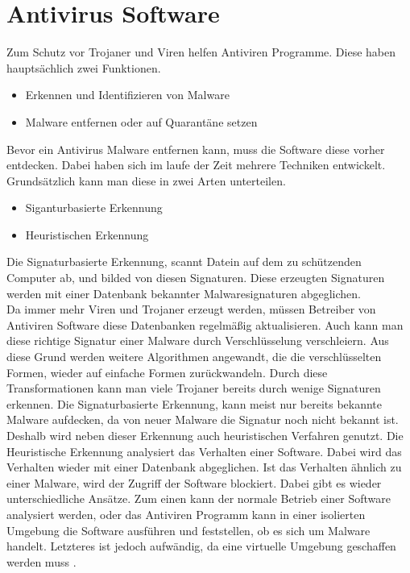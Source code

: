 \section{Antivirus Software}\label{sec:antivirus}
Zum Schutz vor Trojaner und Viren helfen Antiviren Programme. Diese haben hauptsächlich zwei Funktionen.
\begin{itemize}
    \item Erkennen und Identifizieren von Malware
    \item Malware entfernen oder auf Quarantäne setzen
\end{itemize}
Bevor ein Antivirus Malware entfernen kann, muss die Software diese vorher entdecken. Dabei haben sich im laufe der Zeit mehrere Techniken entwickelt. Grundsätzlich kann man diese in zwei Arten unterteilen.\cite{ANTNE1}
\begin{itemize}
    \item Siganturbasierte Erkennung
    \item Heuristischen Erkennung
\end{itemize}
Die Signaturbasierte Erkennung, scannt Datein auf dem zu schützenden Computer ab, und bilded von diesen Signaturen. Diese erzeugten Signaturen werden mit einer Datenbank bekannter Malwaresignaturen abgeglichen.\\
Da immer mehr Viren und Trojaner erzeugt werden, müssen Betreiber von Antiviren Software diese Datenbanken regelmäßig aktualisieren. Auch kann man diese richtige Signatur einer Malware durch Verschlüsselung verschleiern. Aus diese Grund werden weitere Algorithmen angewandt, die die verschlüsselten Formen, wieder auf einfache Formen zurückwandeln. Durch diese Transformationen kann man viele Trojaner bereits durch wenige Signaturen erkennen\cite{ANTNE2}.
Die Signaturbasierte Erkennung, kann meist nur bereits bekannte Malware aufdecken, da von neuer Malware die Signatur noch nicht bekannt ist. Deshalb wird neben dieser Erkennung auch heuristischen Verfahren genutzt. 
Die Heuristische Erkennung analysiert das Verhalten einer Software. Dabei wird das Verhalten wieder mit einer Datenbank abgeglichen. Ist das Verhalten ähnlich zu einer Malware, wird der Zugriff der Software blockiert. Dabei gibt es wieder unterschiedliche Ansätze. Zum einen kann der normale Betrieb einer Software analysiert werden, oder das Antiviren Programm kann in einer isolierten Umgebung die Software ausführen und feststellen, ob es sich um Malware handelt. Letzteres ist jedoch aufwändig, da eine virtuelle Umgebung geschaffen werden muss \cite{ANTNE3}.